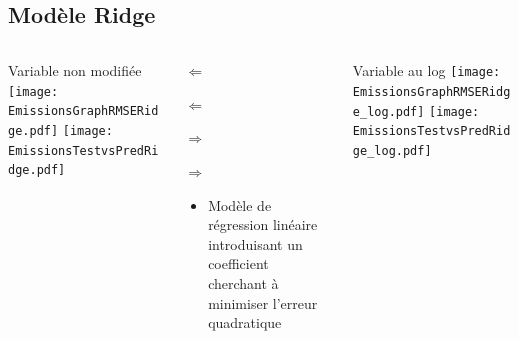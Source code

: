 \documentclass[8pt,aspectratio=169,hyperref={unicode=true}]{beamer}
\begin{document}
\subsection{Modèle Ridge}
\begin{frame}{\insertsubsection}
  \begin{columns}[t]
    \begin{column}{.33\textwidth}
      \centering Variable non modifiée
      \texttt{[image: EmissionsGraphRMSERidge.pdf]}
      \texttt{[image: EmissionsTestvsPredRidge.pdf]}
    \end{column}
    \begin{column}{.33\textwidth}
      $\Longleftarrow$
      \scriptsize
      {\centering
        }
      

      \normalsize
      $\Longleftarrow$

      \raggedleft $\Longrightarrow$
      \scriptsize
      {\centering
        }
      

      \normalsize
      $\Longrightarrow$

      \raggedright
      \begin{itemize}
        \item Modèle de régression linéaire introduisant un coefficient cherchant à minimiser
              l'erreur quadratique  
      \end{itemize}

    \end{column}
    \begin{column}{.33\textwidth}
      \centering Variable au log
      \texttt{[image: EmissionsGraphRMSERidge\_log.pdf]}
      \texttt{[image: EmissionsTestvsPredRidge\_log.pdf]}
    \end{column}
  \end{columns}
\end{frame}
\end{document}
